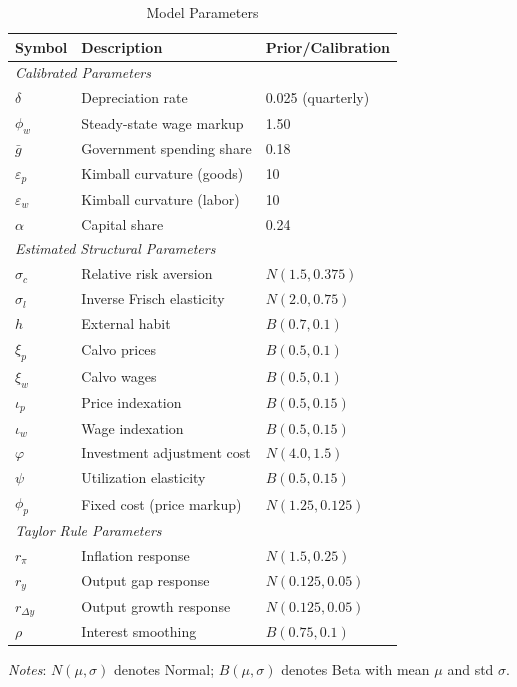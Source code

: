 \documentclass[12pt]{article}
\begin{document}
\begin{table}[H]
\centering
\caption{Model Parameters}
\small
\begin{tabular}{lll}
\toprule
Symbol & Description & Prior/Calibration \\
\midrule
\multicolumn{3}{l}{\textit{Calibrated Parameters}} \\
$\delta$ & Depreciation rate & 0.025 (quarterly) \\
$\phi_w$ & Steady-state wage markup & 1.50 \\
$\bar{g}$ & Government spending share & 0.18 \\
$\varepsilon_p$ & Kimball curvature (goods) & 10 \\
$\varepsilon_w$ & Kimball curvature (labor) & 10 \\
$\alpha$ & Capital share & 0.24 \\
\midrule
\multicolumn{3}{l}{\textit{Estimated Structural Parameters}} \\
$\sigma_c$ & Relative risk aversion & $N(1.5, 0.375)$ \\
$\sigma_l$ & Inverse Frisch elasticity & $N(2.0, 0.75)$ \\
$h$ & External habit & $B(0.7, 0.1)$ \\
$\xi_p$ & Calvo prices & $B(0.5, 0.1)$ \\
$\xi_w$ & Calvo wages & $B(0.5, 0.1)$ \\
$\iota_p$ & Price indexation & $B(0.5, 0.15)$ \\
$\iota_w$ & Wage indexation & $B(0.5, 0.15)$ \\
$\varphi$ & Investment adjustment cost & $N(4.0, 1.5)$ \\
$\psi$ & Utilization elasticity & $B(0.5, 0.15)$ \\
$\phi_p$ & Fixed cost (price markup) & $N(1.25, 0.125)$ \\
\midrule
\multicolumn{3}{l}{\textit{Taylor Rule Parameters}} \\
$r_\pi$ & Inflation response & $N(1.5, 0.25)$ \\
$r_y$ & Output gap response & $N(0.125, 0.05)$ \\
$r_{\Delta y}$ & Output growth response & $N(0.125, 0.05)$ \\
$\rho$ & Interest smoothing & $B(0.75, 0.1)$ \\
\bottomrule
\end{tabular}
\begin{flushleft}
\small \textit{Notes}: $N(\mu, \sigma)$ denotes Normal; $B(\mu, \sigma)$ denotes Beta with mean $\mu$ and std $\sigma$.
\end{flushleft}
\end{table}
\end{document}
